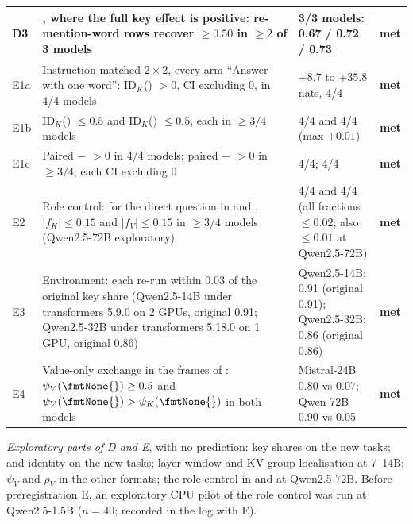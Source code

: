 \begin{table}[!ht]
\begin{tabular}{p{}p{}p{}p{}}
D3 & \fmtPost{}, where the full key effect is positive: re-mention-word rows recover $\geq 0.50$ in $\geq 2$ of 3 models & 3/3 models: 0.67 / 0.72 / 0.73 & \textbf{met} \\
\midrule
E1a & Instruction-matched $2{\times}2$, every arm ``Answer with one word'': ID$_K$(\fmtListA{}) $> 0$, CI excluding 0, in 4/4 models & $+8.7$ to $+35.8$ nats, 4/4 & \textbf{met} \\
E1b & ID$_K$(\fmtBefore{}) $\leq 0.5$ and ID$_K$(\fmtSentB{}) $\leq 0.5$, each in $\geq 3/4$ models & 4/4 and 4/4 (max $+0.01$) & \textbf{met} \\
E1c & Paired \fmtListA{} $-$ \fmtBefore{} $> 0$ in 4/4 models; paired \fmtPost{} $-$ \fmtSentB{} $> 0$ in $\geq 3/4$; each CI excluding 0 & 4/4; 4/4 & \textbf{met} \\
E2 & Role control: for the direct question in \fmtOpt{} and \fmtNone{}, $\lvert f_K \rvert \leq 0.15$ and $\lvert f_V \rvert \leq 0.15$ in $\geq 3/4$ models (Qwen2.5-72B exploratory) & 4/4 and 4/4 (all fractions $\leq 0.02$; also $\leq 0.01$ at Qwen2.5-72B) & \textbf{met} \\
E3 & Environment: each re-run within 0.03 of the original \fmtOpt{} key share (Qwen2.5-14B under transformers 5.9.0 on 2 GPUs, original 0.91; Qwen2.5-32B under transformers 5.18.0 on 1 GPU, original 0.86) & Qwen2.5-14B: 0.91 (original 0.91); Qwen2.5-32B: 0.86 (original 0.86) & \textbf{met} \\
E4 & Value-only exchange in the frames of \citet{anonymous2026fitted}: $\psi_V(\text{\fmtNone{}}) \geq 0.5$ and $\psi_V(\text{\fmtNone{}}) > \psi_K(\text{\fmtNone{}})$ in both models & Mistral-24B 0.80 vs 0.07; Qwen-72B 0.90 vs 0.05 & \textbf{met} \\
\bottomrule
\end{tabular}

\smallskip
\begin{minipage}{0.94\textwidth}
\footnotesize
\emph{Exploratory parts of D and E}, with no prediction: key shares on the new tasks; \fmtLetter{} and \fmtPost{} identity on the new tasks; layer-window and KV-group localisation at 7--14B; $\psi_V$ and $\rho_V$ in the other formats; the role control in \fmtLetter{} and at Qwen2.5-72B. Before preregistration E, an exploratory CPU pilot of the role control was run at Qwen2.5-1.5B ($n = 40$; recorded in the log with E).
\end{minipage}
\end{table}

